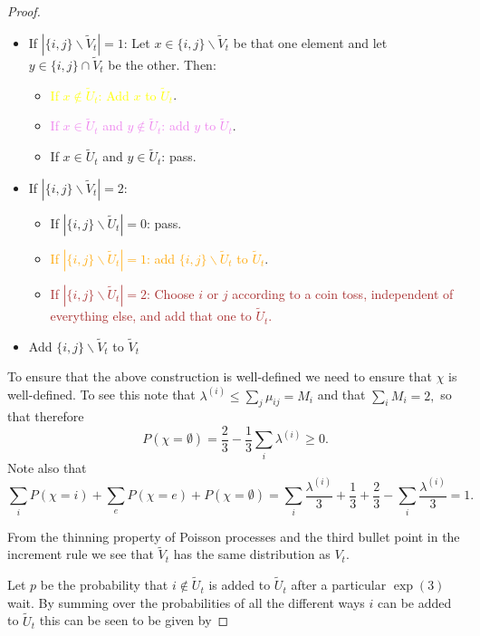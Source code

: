 \documentclass[12pt]{article}
\theoremstyle{definition}
\begin{document}
\begin{proof}
\begin{itemize}
\begin{itemize}
\begin{itemize}
        \end{itemize}
        \item If $|\{i,j\}\backslash \tilde{V}_t|=1$:
        Let $x \in \{i,j\}\backslash \tilde{V}_t$ be that one element and let $y \in \{i,j\} \cap \tilde{V}_t$ be the other. Then:
        \begin{itemize}
        \item \textcolor{yellow}{If $x \notin \tilde{U}_t$: Add $x$ to $\tilde{U}_t$}.
        \item \textcolor{violet}{If $x \in \tilde{U}_t$ and $y \notin \tilde{U}_t$: add $y$ to $\tilde{U}_t$}.
        \item If $x \in \tilde{U}_t$ and $y \in \tilde{U}_t$: pass.
        \end{itemize}
        
        \item If $|\{i,j\}\backslash \tilde{V}_t|=2$:
        \begin{itemize}
            \item If $|\{i,j\}\backslash \tilde{U}_t| = 0$: pass.
            \item \textcolor{orange}{If $|\{i,j\} \backslash \tilde{U}_t| =1$: add $\{i,j\} \backslash \tilde{U}_t$ to $\tilde{U}_t$}.
            \item \textcolor{brown}{If $|\{i,j\} \backslash \tilde{U}_t| = 2$: Choose $i$ or $j$ according to a coin toss, independent of everything else, and add that one to $\tilde{U}_t$.}
        \end{itemize}
        
        \item Add $\{i,j\} \backslash \tilde{V}_t$ to $\tilde{V}_t$
    \end{itemize}
\end{itemize}
To ensure that the above construction is well-defined we need to ensure that $\chi$ is well-defined. To see this note that $\lambda^{(i)} \leq \sum_{j}\mu_{ij} = M_i$ and that $ \sum_i M_i = 2,$ so that therefore $$P(\chi = \emptyset) = \frac{2}{3}-\frac{1}{3}\sum_i\lambda^{(i)} \geq 0.$$ Note also that $$\sum_iP(\chi = i)+\sum_e P(\chi = e) + P(\chi=\emptyset) = \sum_i\frac{\lambda^{(i)}}{3}+\frac{1}{3}+\frac{2}{3}-\sum_i\frac{\lambda^{(i)}}{3}= 1.$$


From the thinning property of Poisson processes and the third bullet point in the increment rule we see that $\tilde{V}_t$ has the same distribution as $V_t$.

Let $p$ be the probability that $i \notin \tilde{U}_t$ is added to $\tilde{U}_t$ after a particular $\exp(3)$ wait. By summing over the probabilities of all the different ways $i$ can be added to $\tilde{U}_t$ this can be seen to be given by


\end{proof}
\end{document}
